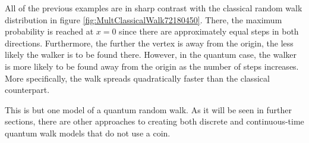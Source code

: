 \documentclass[../../dissertation.tex]{subfiles}
\begin{document}
All of the previous examples are in sharp contrast with the classical random
walk distribution in figure \ref{fig:MultClassicalWalk72180450}. There, the maximum
probability is reached at $x=0$ since there are approximately equal steps in
both directions.  Furthermore, the further the vertex is away from the origin,
the less likely the walker is to be found there. However, in the quantum case,
the walker is more likely to be found away from the origin as the number of
steps increases.  More specifically, the walk spreads quadratically faster than
the classical counterpart.\par

This is but one model of a quantum random walk. As it will be seen in further
sections, there are other approaches to creating both discrete and continuous-time
quantum walk models that do not use a coin. 
\end{document}
